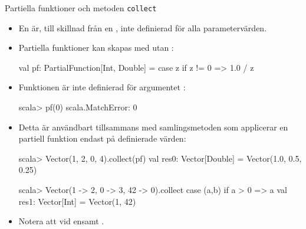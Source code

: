 \begin{Slide}{Partiella funktioner och metoden \texttt{collect}}\SlideFontSmall
\begin{itemize}
\item En   är, till skillnad från en  , inte definierad för alla parametervärden.
\item Partiella funktioner kan skapas med  utan :
\begin{Code}
val pf: PartialFunction[Int, Double] = { case z if z != 0 => 1.0 / z }  
\end{Code}
\item  Funktionen är inte definierad för argumentet :

\begin{REPLsmall}
scala> pf(0)                         
scala.MatchError: 0 
\end{REPLsmall}
\item 
Detta är användbart tillsammans med samlingsmetoden  som  applicerar en partiell funktion endast på definierade värden: 
\begin{REPLsmall}
scala> Vector(1, 2, 0, 4).collect(pf)
val res0: Vector[Double] = Vector(1.0, 0.5, 0.25)

scala> Vector(1 -> 2, 0 -> 3, 42 -> 0).collect{ case (a,b) if a > 0 => a } 
val res1: Vector[Int] = Vector(1, 42)

\end{REPLsmall}
\item Notera att  vid ensamt .



\end{itemize}
\end{Slide}


